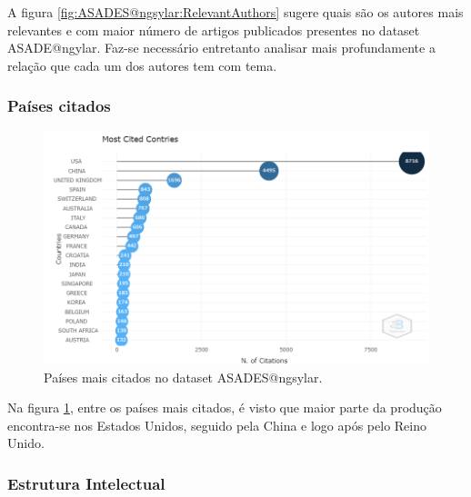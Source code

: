 A figura \ref{fig:ASADES@ngsylar:RelevantAuthors} sugere quais são os autores mais relevantes e com maior número de artigos publicados presentes no dataset ASADE@ngylar. Faz-se necessário entretanto analisar mais profundamente a relação que cada um dos autores tem com tema.

\subsubsection{Países citados}

\begin{figure}[H]
    \centering
    \includegraphics[angle=0,width=1\textwidth]{experiments/ngsylar/PesqBibliogr/Imagens/ASADES-MostCitedCountries.png}
    \caption{Países mais citados no dataset ASADES@ngsylar.}
    \label{fig:ASADES@ngsylar:MostCitedCountries}
\end{figure}

Na figura \ref{fig:ASADES@ngsylar:MostCitedCountries}, entre os países mais citados, é visto que maior parte da produção encontra-se nos Estados Unidos, seguido pela China e logo após pelo Reino Unido.

\subsubsection{Estrutura Intelectual}

